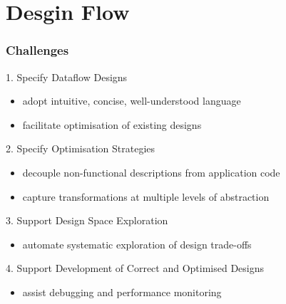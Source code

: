 \section{Desgin Flow}
\begin{frame}
  \frametitle{Challenges}

  \begin{beamerboxesrounded}{1. Specify Dataflow Designs}
    \begin{itemize}
    \item adopt intuitive, concise, well-understood language
    \item facilitate optimisation of existing designs
    \end{itemize}
  \end{beamerboxesrounded}

  \begin{beamerboxesrounded}{2. Specify Optimisation Strategies}
    \begin{itemize}
    \item decouple non-functional descriptions from application code
    \item capture transformations at multiple levels of abstraction
    \end{itemize}
  \end{beamerboxesrounded}

  \begin{beamerboxesrounded}{3. Support Design Space Exploration}
    \begin{itemize}
    \item automate systematic exploration of design trade-offs
    \end{itemize}
  \end{beamerboxesrounded}
  \begin{beamerboxesrounded}{4. Support Development of Correct and Optimised Designs}
    \begin{itemize}
    \item assist debugging and performance monitoring
    \end{itemize}
  \end{beamerboxesrounded}
\end{frame}

